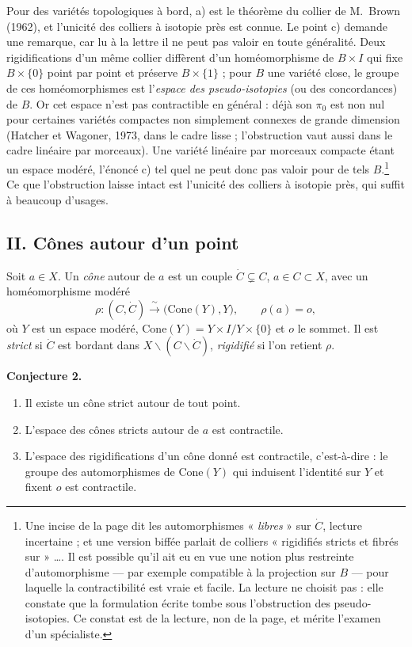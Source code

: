 \documentclass[11pt,a4paper]{article}
\begin{document}
Pour des variétés topologiques à bord, a) est le théorème du collier de
M.~Brown (1962), et l'unicité des colliers à isotopie près est connue. Le
point c) demande une remarque, car lu à la lettre il ne peut pas valoir en
toute généralité. Deux rigidifications d'un même collier diffèrent d'un
homéomorphisme de $B \times I$ qui fixe $B \times \{0\}$ point par point et
préserve $B \times \{1\}$ ; pour $B$ une variété close, le groupe de ces
homéomorphismes est l'\emph{espace des pseudo-isotopies} (ou des
concordances) de $B$. Or cet espace n'est pas contractible en général : déjà
son $\pi_0$ est non nul pour certaines variétés compactes non simplement
connexes de grande dimension (Hatcher et Wagoner, 1973, dans le cadre lisse ;
l'obstruction vaut aussi dans le cadre linéaire par morceaux). Une variété
linéaire par morceaux compacte étant un espace modéré, l'énoncé c) tel quel
ne peut donc pas valoir pour de tels $B$.\footnote{Une incise de la page
dit les automorphismes « \emph{libres} » sur $\dot C$, lecture incertaine ;
et une version biffée parlait de colliers « rigidifiés stricts et fibrés
sur » \ldots. Il est possible qu'il ait eu en vue une notion plus restreinte
d'automorphisme — par exemple compatible à la projection sur $B$ — pour
laquelle la contractibilité est vraie et facile. La lecture ne choisit pas :
elle constate que la formulation écrite tombe sous l'obstruction des
pseudo-isotopies. Ce constat est de la lecture, non de la page, et mérite
l'examen d'un spécialiste.} Ce que l'obstruction laisse intact est l'unicité
des colliers à isotopie près, qui suffit à beaucoup d'usages.

\subsection*{II. Cônes autour d'un point}

Soit $a \in X$. Un \emph{cône} autour de $a$ est un couple
$\dot C \subsetneq C$, $a \in C \subset X$, avec un homéomorphisme modéré
\[
  \rho \colon (C, \dot C) \xrightarrow{\ \sim\ } \bigl(\mathrm{Cone}(Y), Y\bigr),
  \qquad \rho(a) = o,
\]
où $Y$ est un espace modéré, $\mathrm{Cone}(Y) = Y \times I / Y \times
\{0\}$ et $o$ le sommet. Il est \emph{strict} si $\dot C$ est bordant dans
$X \smallsetminus (C \smallsetminus \dot C)$, \emph{rigidifié} si l'on retient
$\rho$.

\textbf{Conjecture 2.}
\begin{enumerate}
\item[a)] Il existe un cône strict autour de tout point.
\item[b)] L'espace des cônes stricts autour de $a$ est contractile.
\item[c)] L'espace des rigidifications d'un cône donné est contractile,
  c'est-à-dire : le groupe des automorphismes de $\mathrm{Cone}(Y)$ qui
  induisent l'identité sur $Y$ et fixent $o$ est contractile.
\end{enumerate}
\end{document}
